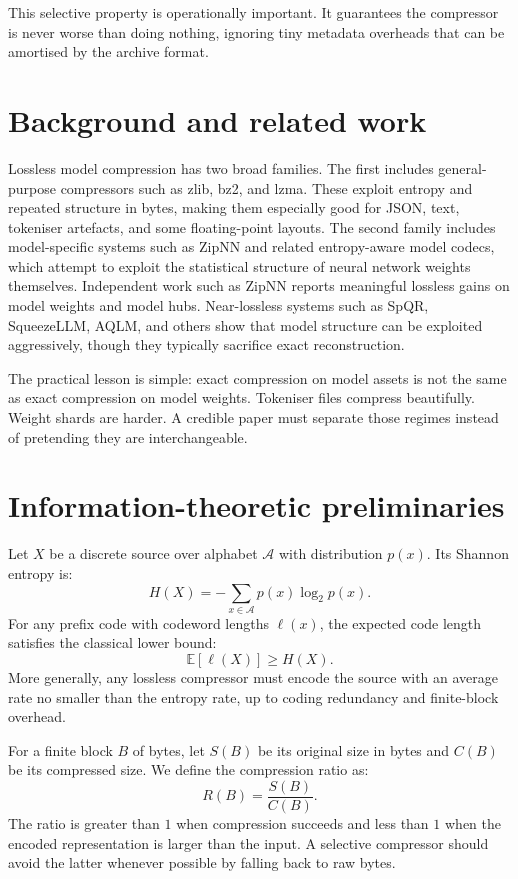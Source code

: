 \documentclass[11pt]{article}
\begin{document}
This selective property is operationally important. It guarantees the compressor is never worse than doing nothing, ignoring tiny metadata overheads that can be amortised by the archive format.

\section{Background and related work}

Lossless model compression has two broad families. The first includes general-purpose compressors such as zlib, bz2, and lzma. These exploit entropy and repeated structure in bytes, making them especially good for JSON, text, tokeniser artefacts, and some floating-point layouts. The second family includes model-specific systems such as ZipNN and related entropy-aware model codecs, which attempt to exploit the statistical structure of neural network weights themselves. Independent work such as ZipNN reports meaningful lossless gains on model weights and model hubs. Near-lossless systems such as SpQR, SqueezeLLM, AQLM, and others show that model structure can be exploited aggressively, though they typically sacrifice exact reconstruction.

The practical lesson is simple: exact compression on model assets is not the same as exact compression on model weights. Tokeniser files compress beautifully. Weight shards are harder. A credible paper must separate those regimes instead of pretending they are interchangeable.

\section{Information-theoretic preliminaries}

Let $X$ be a discrete source over alphabet $\mathcal{A}$ with distribution $p(x)$. Its Shannon entropy is:
\[
H(X) = -\sum_{x \in \mathcal{A}} p(x) \log_2 p(x).
\]
For any prefix code with codeword lengths $\ell(x)$, the expected code length satisfies the classical lower bound:
\[
\mathbb{E}[\ell(X)] \ge H(X).
\]
More generally, any lossless compressor must encode the source with an average rate no smaller than the entropy rate, up to coding redundancy and finite-block overhead.

For a finite block $B$ of bytes, let $S(B)$ be its original size in bytes and $C(B)$ be its compressed size. We define the compression ratio as:
\[
R(B) = \frac{S(B)}{C(B)}.
\]
The ratio is greater than $1$ when compression succeeds and less than $1$ when the encoded representation is larger than the input. A selective compressor should avoid the latter whenever possible by falling back to raw bytes.
\end{document}
